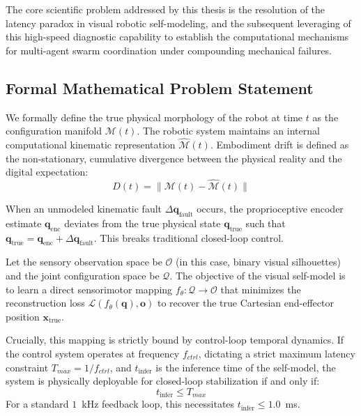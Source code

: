 \documentclass[12pt,a4paper,oneside]{report}
\begin{document}
The core scientific problem addressed by this thesis is the resolution of the latency paradox in visual robotic self-modeling, and the subsequent leveraging of this high-speed diagnostic capability to establish the computational mechanisms for multi-agent swarm coordination under compounding mechanical failures.

\subsection{Formal Mathematical Problem Statement}
\label{subsec:formal_mathematical_problem_statement_intro}

We formally define the true physical morphology of the robot at time $t$ as the configuration manifold $\mathcal{M}(t)$. The robotic system maintains an internal computational kinematic representation $\hat{\mathcal{M}}(t)$. Embodiment drift is defined as the non-stationary, cumulative divergence between the physical reality and the digital expectation:
\begin{equation}
D(t) = \|\mathcal{M}(t) - \hat{\mathcal{M}}(t)\|
\end{equation}

When an unmodeled kinematic fault $\Delta \mathbf{q}_{\text{fault}}$ occurs, the proprioceptive encoder estimate $\mathbf{q}_{\text{enc}}$ deviates from the true physical state $\mathbf{q}_{\text{true}}$ such that $\mathbf{q}_{\text{true}} = \mathbf{q}_{\text{enc}} + \Delta \mathbf{q}_{\text{fault}}$. This breaks traditional closed-loop control. 

Let the sensory observation space be $\mathcal{O}$ (in this case, binary visual silhouettes) and the joint configuration space be $\mathcal{Q}$. The objective of the visual self-model is to learn a direct sensorimotor mapping $f_\theta: \mathcal{Q} \rightarrow \mathcal{O}$ that minimizes the reconstruction loss $\mathcal{L}(f_\theta(\mathbf{q}), \mathbf{o})$ to recover the true Cartesian end-effector position $\mathbf{x}_{\text{true}}$. 

Crucially, this mapping is strictly bound by control-loop temporal dynamics. If the control system operates at frequency $f_{ctrl}$, dictating a strict maximum latency constraint $T_{max} = 1/f_{ctrl}$, and $t_{\text{infer}}$ is the inference time of the self-model, the system is physically deployable for closed-loop stabilization if and only if:
\begin{equation}
t_{\text{infer}} \le T_{max}
\end{equation}
For a standard $1$~kHz feedback loop, this necessitates $t_{\text{infer}} \le 1.0$~ms.
\end{document}
